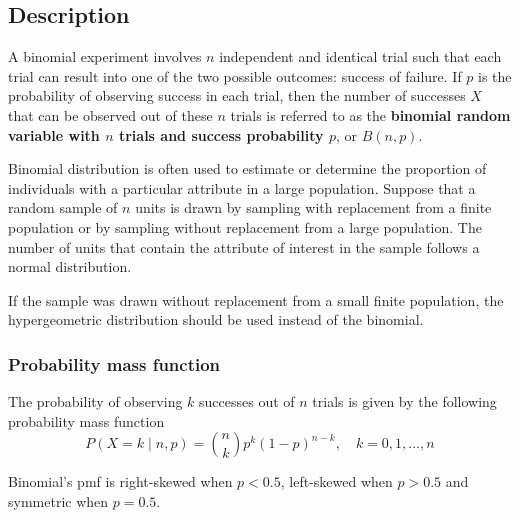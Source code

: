 \subsection{Description}
A binomial experiment involves $n$ independent and identical trial such that each trial can result into one of the two possible outcomes: success of failure. If $p$ is the probability of observing success in each trial, then the number of successes $X$ that can be observed out of these $n$ trials is referred to as the \textbf{binomial random variable with $n$ trials and success probability $p$}, or $B(n, p)$.

Binomial distribution is often used to estimate or determine the proportion of individuals with a particular attribute in a large population. Suppose that a random sample of $n$ units is drawn by sampling with replacement from a finite population or by sampling without replacement from a large population. The number of units that contain the attribute of interest in the sample follows a normal distribution.

If the sample was drawn without replacement from a small finite population, the hypergeometric distribution should be used instead of the binomial.

\subsubsection{Probability mass function}
The probability of observing $k$ successes out of $n$ trials is given by the following probability mass function
\[
	P(X = k \mid n, p) = \binom{n}{k}p^{k}(1 - p)^{n - k}, \quad k = 0, 1, \ldots, n
\]

Binomial's pmf is right-skewed when $p < 0.5$, left-skewed when $p > 0.5$ and symmetric when $p = 0.5$.

